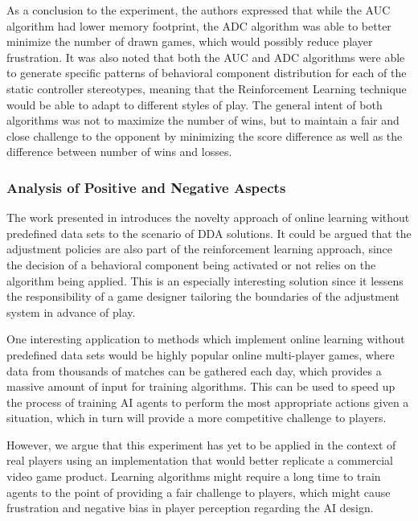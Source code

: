 As a conclusion to the experiment, the authors expressed that while the AUC algorithm had lower memory footprint, the ADC algorithm was able to better minimize the number of drawn games, which would possibly reduce player frustration. It was also noted that both the AUC and ADC algorithms were able to generate specific patterns of behavioral component distribution for each of the static controller stereotypes, meaning that the Reinforcement Learning technique would be able to adapt to different styles of play. The general intent of both algorithms was not to maximize the number of wins, but to maintain a fair and close challenge to the opponent by minimizing the score difference as well as the difference between number of wins and losses.

\subsubsection{Analysis of Positive and Negative Aspects}

The work presented in \cite{article_adaptivebehaviorai} introduces the novelty approach of online learning without predefined data sets to the scenario of DDA solutions. It could be argued that the adjustment policies are also part of the reinforcement learning approach, since the decision of a behavioral component being activated or not relies on the algorithm being applied. This is an especially interesting solution since it lessens the responsibility of a game designer tailoring the boundaries of the adjustment system in advance of play.

One interesting application to methods which implement online learning without predefined data sets would be highly popular online multi-player games, where data from thousands of matches can be gathered each day, which provides a massive amount of input for training algorithms. This can be used to speed up the process of training AI agents to perform the most appropriate actions given a situation, which in turn will provide a more competitive challenge to players.


However, we argue that this experiment has yet to be applied in the context of real players using an implementation that would better replicate a commercial video game product. Learning algorithms might require a long time to train agents to the point of providing a fair challenge to players, which might cause frustration and negative bias in player perception regarding the AI design.

